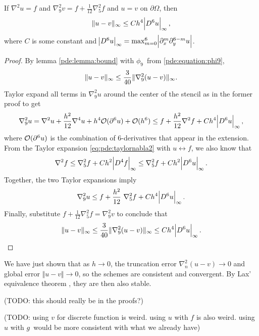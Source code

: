 \begin{theorem}\label{thm:nine}
If $\nabla^2 u = f$ and $\nabla_9^2 v = f + \frac{1}{12} \nabla_5^2 f$ and $u = v$ on $\partial \Omega$, then
$$
\lVert u - v \rVert_\infty \leq C h^4 \abs{D^6 u}_\infty,
$$
where $C$ is some constant and $\abs{D^6 u}_\infty = \max_{m=0}^6 \abs{\partial_x^m \partial_y^{6-m} u}$.
\end{theorem}
\begin{proof}
By lemma \ref{pde:lemma:bound} with $\phi_9$ from \ref{pde:equation:phi9},
$$
\lVert u - v \rVert_\infty \leq \frac{3}{40} \lVert \nabla_9^2 (u  - v) \rVert_\infty.
$$
Taylor expand all terms in $\nabla_9^2 u$ around the center of the stencil as in the former proof to get
\begin{equation*}
\nabla_9^2 u = \nabla^2 u + \frac{h^2}{12} \nabla^4 u + h^4 \mathcal{O}(\partial^6 u) + \mathcal{O}(h^6) \leq f + \frac{h^2}{12} \nabla^2 f + Ch^4 \abs{D^6 u}_\infty,
\end{equation*}
where $\mathcal{O}(\partial^6 u)$ is the combination of $6$-derivatives that appear in the extension.
From the Taylor expansion \ref{eq:pde:taylornabla2} with $u \leftrightarrow f$, we also know that
\begin{equation*}
\nabla^2 f \leq \nabla_5^2 f + Ch^2 \abs{D^4 f}_\infty \leq \nabla_5^2 f + Ch^2 \abs{D^6 u}_\infty.
\end{equation*}
Together, the two Taylor expansions imply
\begin{equation*}
	\nabla_9^2 u \leq f + \frac{h^2}{12} \nabla_5^2 f + Ch^4 \abs{D^6 u}_\infty.
\end{equation*}
Finally, substitute $f + \frac{1}{12} \nabla_5^2 f = \nabla_9^2 v$ to conclude that
\begin{equation*}
  \lVert u-v \rVert_\infty \leq \frac{3}{40} \lVert \nabla_9^2 (u - v) \rVert_\infty \leq C h^4 \abs{D^6 u}_\infty. \qedhere
\end{equation*}
\end{proof}

We have just shown that as $h \rightarrow 0$, the truncation error $\nabla_n^2 (u - v) \rightarrow 0$ and global error $\Vert u - v \Vert \rightarrow 0$, so the schemes are consistent and convergent.
By Lax' equivalence theorem \cite{owren}, they are then also stable.

(TODO: this should really be in the proofs?)

(TODO: using $v$ for discrete function is weird. using $u$ with $f$ is also weird. using $u$ with $g$ would be more consistent with what we already have)

